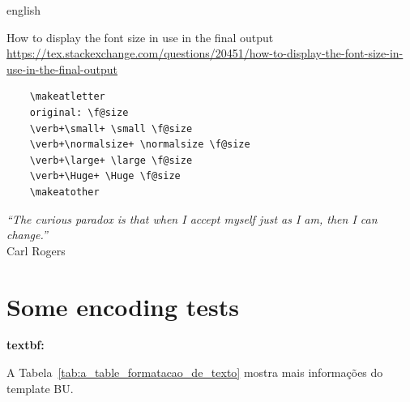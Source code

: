 \begin{otherlanguage*}{english}

    How to display the font size in use in the final output
    \url{https://tex.stackexchange.com/questions/20451/how-to-display-the-font-size-in-use-in-the-final-output}

    \begin{verbatim}
    \makeatletter
    original: \f@size
    \verb+\small+ \small \f@size
    \verb+\normalsize+ \normalsize \f@size
    \verb+\large+ \large \f@size
    \verb+\Huge+ \Huge \f@size
    \makeatother
    \end{verbatim}



    \begin{flushright}
        \textit{``The curious paradox is that when I accept myself just as I am, then I can change.''} \\
        Carl Rogers
    \end{flushright}

    \newpage

     

    \section*[Some encoding tests]{Some encoding tests}

    \sloppy
    \textbf{textbf:  }
    \fussy

\end{otherlanguage*}




A Tabela~\ref{tab:a_table_formatacao_de_texto} mostra mais informações do template BU.

